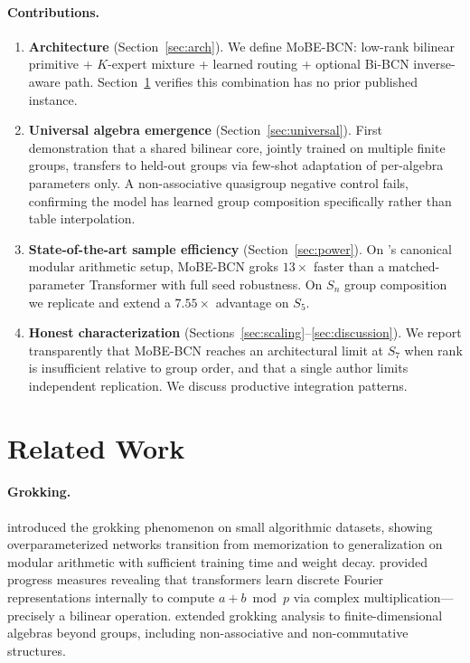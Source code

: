 \documentclass[11pt]{article}
\begin{document}
\paragraph{Contributions.}
\begin{enumerate}
\item \textbf{Architecture} (Section~\ref{sec:arch}). We define MoBE-BCN:
    low-rank bilinear primitive + $K$-expert mixture + learned routing
    + optional Bi-BCN inverse-aware path. Section~\ref{sec:related}
    verifies this combination has no prior published instance.
\item \textbf{Universal algebra emergence} (Section~\ref{sec:universal}).
    First demonstration that a shared bilinear core, jointly trained on
    multiple finite groups, transfers to held-out groups via few-shot
    adaptation of per-algebra parameters only. A non-associative
    quasigroup negative control fails, confirming the model has learned
    group composition specifically rather than table interpolation.
\item \textbf{State-of-the-art sample efficiency}
    (Section~\ref{sec:power}). On \citet{power2022grokking}'s canonical
    modular arithmetic setup, MoBE-BCN groks $13\times$ faster than a
    matched-parameter Transformer with full seed robustness. On $S_n$
    group composition we replicate and extend a $7.55\times$ advantage
    on $S_5$.
\item \textbf{Honest characterization}
    (Sections~\ref{sec:scaling}--\ref{sec:discussion}). We report
    transparently that MoBE-BCN reaches an architectural limit at $S_7$
    when rank is insufficient relative to group order, and that a
    single author limits independent replication. We discuss
    productive integration patterns.
\end{enumerate}

\section{Related Work}
\label{sec:related}

\paragraph{Grokking.}
\citet{power2022grokking} introduced the grokking phenomenon on small
algorithmic datasets, showing overparameterized networks transition
from memorization to generalization on modular arithmetic with
sufficient training time and weight decay.
\citet{nanda2023progress} provided progress measures revealing that
transformers learn discrete Fourier representations internally to
compute $a + b \bmod p$ via complex multiplication---precisely a
bilinear operation. \citet{tikeng2026grokking} extended grokking
analysis to finite-dimensional algebras beyond groups, including
non-associative and non-commutative structures.
\end{document}
